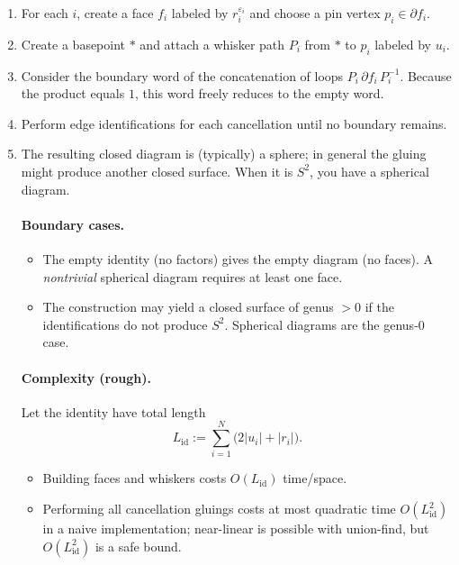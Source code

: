 \documentclass[11pt]{article}
\theoremstyle{definition}
\theoremstyle{plain}
\theoremstyle{remark}
\begin{document}
\begin{enumerate}[leftmargin=2.2em]
\item For each $i$, create a face $f_i$ labeled by $r_i^{\varepsilon_i}$ and choose a pin vertex $p_i\in\partial f_i$.
\item Create a basepoint $*$ and attach a whisker path $P_i$ from $*$ to $p_i$ labeled by $u_i$.
\item Consider the boundary word of the concatenation of loops $P_i\,\partial f_i\,P_i^{-1}$.
Because the product equals $1$, this word freely reduces to the empty word.
\item Perform edge identifications for each cancellation until no boundary remains.
\item The resulting closed diagram is (typically) a sphere; in general the gluing might produce another closed surface.
When it is $S^2$, you have a spherical diagram.


\paragraph{Boundary cases.}
\begin{itemize}[leftmargin=2em]
\item The empty identity (no factors) gives the empty diagram (no faces). A \emph{nontrivial} spherical diagram requires at least one face.
\item The construction may yield a closed surface of genus $>0$ if the identifications do not produce $S^2$. Spherical diagrams are the genus-$0$ case.
\end{itemize}

\paragraph{Complexity (rough).}\cite{gersten1987,sieradski1983,lyndonschupp1977}
Let the identity have total length
\[
L_{\mathrm{id}} := \sum_{i=1}^N \bigl(2|u_i|+|r_i|\bigr).
\]
\begin{itemize}[leftmargin=2em]
\item Building faces and whiskers costs $O(L_{\mathrm{id}})$ time/space.
\item Performing all cancellation gluings costs at most quadratic time $O(L_{\mathrm{id}}^2)$ in a naive implementation; near-linear is possible with union-find, but $O(L_{\mathrm{id}}^2)$ is a safe bound.
\end{itemize}
\end{enumerate}
\end{document}
